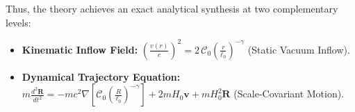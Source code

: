 Thus, the theory achieves an exact analytical synthesis at two complementary levels:
\begin{itemize}
    \item \textbf{Kinematic Inflow Field:} $\left(\frac{v(r)}{c}\right)^2 = 2 \, \mathcal{C}_0 \left(\frac{r}{\ell_0}\right)^{-\gamma}$ (Static Vacuum Inflow).
    \item \textbf{Dynamical Trajectory Equation:} $m \frac{d^2\mathbf{R}}{dt^2} = - m c^2 \nabla \left[ \mathcal{C}_0 \left(\frac{R}{\ell_0}\right)^{-\gamma} \right] + 2 m H_0 \mathbf{v} + m H_0^2 \mathbf{R}$ (Scale-Covariant Motion).
\end{itemize}
